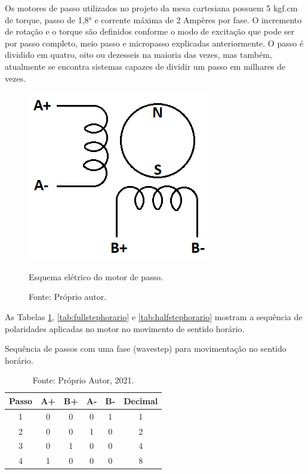 Os motores de passo utilizados no projeto da mesa cartesiana possuem 5 kgf.cm de torque, passo de 1,8° e 
corrente máxima de 2 Ampères por fase. O incremento de rotação e o torque são definidos conforme o modo 
de excitação que pode ser por passo completo, meio passo e micropasso explicadas anteriormente. O passo 
é dividido em quatro, oito ou dezesseis na maioria das vezes, mas também, atualmente se encontra 
sistemas capazes de dividir um passo em milhares de vezes.

\begin{figure}[H]
\centering
\includegraphics[scale = 0.6]{figuras/meumotorbipolar}
\caption{Esquema elétrico do motor de passo.}
\caption*{Fonte: Próprio autor.}
\label{fig:meumotorbipolar}
\end{figure}
    
As Tabelas \ref{tab:wavestephorario}, \ref{tab:fullstephorario} e \ref{tab:halfstephorario} 
mostram a sequência de polaridades aplicadas no motor no movimento de sentido horário.

\begin{table}[H]
    \footnotesize
    \centering
    \caption{Sequência de passos com uma fase (wavestep) para movimentação no sentido horário.}
    \begin{tabular}{cccccc}
        \hline
        \textbf{Passo} & \textbf{A+} & \textbf{B+} & \textbf{A-} & \textbf{B-} & \textbf{Decimal}\\
        \hline
        1 & 0 & 0 & 0 & 1 & 1\\
        2 & 0 & 0 & 1 & 0 & 2\\
        3 & 0 & 1 & 0 & 0 & 4\\
        4 & 1 & 0 & 0 & 0 & 8\\        
        \hline       
    \end{tabular}
    \caption*{Fonte: Próprio Autor, 2021.}
    \label{tab:wavestephorario}
\end{table}

